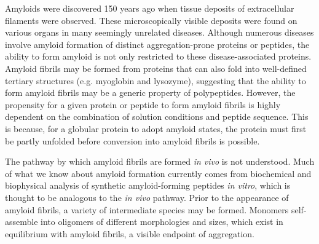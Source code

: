 \label{sec:amyloid}

Amyloids were discovered 150 years ago when tissue deposits of extracellular filaments were observed.\cite{Haass:2007db,Sipe:2000fs} These microscopically visible deposits were found on various organs in many seemingly unrelated diseases. 
Although numerous diseases involve amyloid formation of distinct aggregation-prone proteins or peptides, the ability to form amyloid is not only restricted to these disease-associated proteins. Amyloid fibrils may be formed from proteins that can also fold into well-defined tertiary structures (e.g. myoglobin and lysozyme), suggesting that the ability to form amyloid fibrils may be a generic property of polypeptides.\cite{Chiti:2006fz} However, the propensity for a given protein or peptide to form amyloid fibrils is highly dependent on the combination of solution conditions and peptide sequence. This is because, for a globular protein to adopt amyloid states, the protein must first be partly unfolded before conversion into amyloid fibrils is possible.\cite{Chiti:2006fz} 


The pathway by which amyloid fibrils are formed \textit{in vivo} is not understood. Much of what we know about amyloid formation currently comes from biochemical and biophysical analysis of synthetic amyloid-forming peptides \textit{in vitro}, which is thought to be analogous to the \textit{in vivo} pathway. Prior to the appearance of amyloid fibrils, a variety of intermediate species may be formed.\cite{Chiti:2006fz} Monomers self-assemble into oligomers of different morphologies and sizes, which exist in equilibrium with amyloid fibrils, a visible endpoint of aggregation.\cite{Chiti:2006fz}

